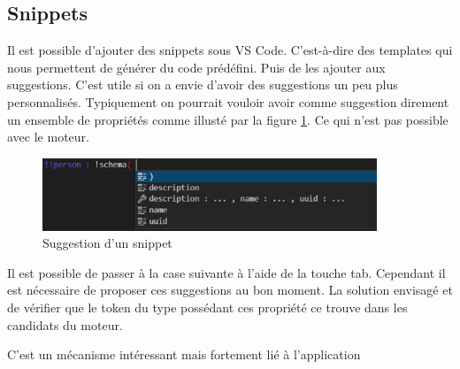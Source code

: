 \documentclass[
    iict, %
    il, %
]{heig-tb}
\begin{document}


\subsection{Snippets}
Il est possible d'ajouter des snippets sous VS Code. C'est-à-dire des templates qui nous permettent de générer du code prédéfini. Puis de les ajouter aux suggestions.
C'est utile si on a envie d'avoir des suggestions un peu plus personnalisés.
Typiquement on pourrait vouloir avoir comme suggestion direment un ensemble de propriétés comme illusté par la figure \ref*{snippet-suggestion}.
Ce qui n'est pas possible avec le moteur.

\begin{figure}[!h]
    \begin{center}
        \includegraphics[width=10cm]{assets/figures/snippet-suggestion.png}
    \end{center}
    \caption[Suggestion d'un snippet]{\label{snippet-suggestion} Suggestion d'un snippet}
\end{figure}



Il est possible de passer à la case suivante à l'aide de la touche tab. %
Cependant il est nécessaire de proposer ces suggestions au bon moment. La solution envisagé et de vérifier que le token du type possédant ces propriété ce trouve dans les candidats du moteur.

C'est un mécanisme intéressant mais fortement lié à l'application
\end{document}
